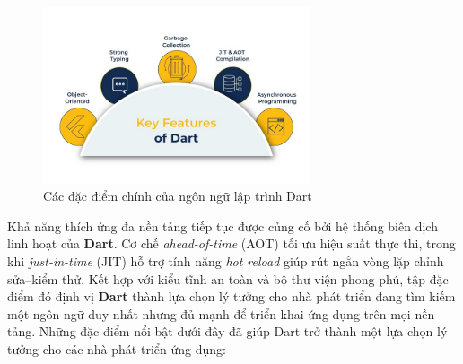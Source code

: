 \documentclass[../DoAn.tex]{subfiles}
\numberwithin{figure}{chapter}
\begin{document}
\begin{figure}[H]
    \centering
    \includegraphics[width=0.7\textwidth]{Hinhve/dartFeatures.jpg}
    \caption{Các đặc điểm chính của ngôn ngữ lập trình Dart}
    \label{fig:dartimg}
\end{figure}

Khả năng thích ứng đa nền tảng tiếp tục được củng cố bởi hệ thống biên dịch linh hoạt của \textbf{Dart}. Cơ chế \emph{ahead-of-time} (AOT) tối ưu hiệu suất thực thi, trong khi \emph{just-in-time} (JIT) hỗ trợ tính năng \emph{hot reload} giúp rút ngắn vòng lặp chỉnh sửa–kiểm thử. Kết hợp với kiểu tĩnh an toàn và bộ thư viện phong phú, tập đặc điểm đó định vị \textbf{Dart} thành lựa chọn lý tưởng cho nhà phát triển đang tìm kiếm một ngôn ngữ duy nhất nhưng đủ mạnh để triển khai ứng dụng trên mọi nền tảng. Những đặc điểm nổi bật dưới đây đã giúp Dart trở thành một lựa chọn lý tưởng cho các nhà phát triển ứng dụng:
\end{document}
